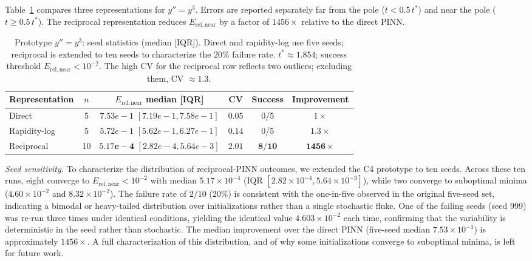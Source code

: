 \documentclass[11pt,a4paper]{article}
\theoremstyle{definition}
\begin{document}
Table~\ref{tab:proto} compares three representations for $y''=y^3$.
Errors are reported separately far from the pole
($t < 0.5\,t^*$) and near the pole ($t \ge 0.5\,t^*$). The reciprocal
representation reduces $E_{\mathrm{rel,near}}$ by a factor of $1456\times$
relative to the direct PINN.

\begin{table}[t]
\centering
\caption{Prototype $y''=y^3$: seed statistics (median [IQR]).
Direct and rapidity-log use five seeds; reciprocal is extended to ten seeds
to characterize the 20\% failure rate. $t^*\approx 1.854$; success threshold $E_{\mathrm{rel,near}}<10^{-2}$. The high CV for the reciprocal row reflects two outliers; excluding them, CV $\approx 1.3$.}
\label{tab:proto}
\begin{tabular}{lccccc}
\toprule
Representation & $n$ & $E_{\mathrm{rel,near}}$ median [IQR] & CV & Success & Improvement \\
\midrule
Direct         & 5 & $7.53e-1$ $[7.19e-1, 7.58e-1]$ & $0.05$ & 0/5 & $1\times$ \\
Rapidity-log   & 5 & $5.72e-1$ $[5.62e-1, 6.27e-1]$ & $0.14$ & 0/5 & $1.3\times$ \\
Reciprocal     & 10 & $\mathbf{5.17e-4}$ $[2.82e-4, 5.64e-3]$ & $\mathbf{2.01}$ & $\mathbf{8/10}$ & $\mathbf{1456\times}$ \\
\bottomrule
\end{tabular}
\end{table}

\emph{Seed sensitivity.} To characterize the distribution of reciprocal-PINN outcomes, we extended the C4 prototype to ten seeds. Across these ten runs, eight converge to $E_{\mathrm{rel,near}} < 10^{-2}$ with median $5.17\times 10^{-4}$ (IQR $[2.82\times 10^{-4}, 5.64\times 10^{-3}]$), while two converge to suboptimal minima ($4.60\times 10^{-2}$ and $8.32\times 10^{-2}$). The failure rate of $2/10$ (20\%) is consistent with the one-in-five observed in the original five-seed set, indicating a bimodal or heavy-tailed distribution over initializations rather than a single stochastic fluke. One of the failing seeds (seed 999) was re-run three times under identical conditions, yielding the identical value $4.603\times 10^{-2}$ each time, confirming that the variability is deterministic in the seed rather than stochastic. The median improvement over the direct PINN (five-seed median $7.53\times 10^{-1}$) is approximately $1456\times$. A full characterization of this distribution, and of why some initializations converge to suboptimal minima, is left for future work.
\end{document}
